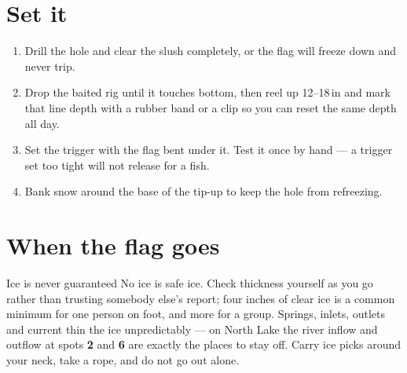\section{Set it}
\begin{enumerate}
\item Drill the hole and clear the slush completely, or the flag will freeze down and never trip.
\item Drop the baited rig until it touches bottom, then reel up 12--18\,in and mark that line depth with a rubber band or a clip so you can reset the same depth all day.
\item Set the trigger with the flag bent under it. Test it once by hand --- a trigger set too tight will not release for a fish.
\item Bank snow around the base of the tip-up to keep the hole from refreezing.
\end{enumerate}

\section{When the flag goes}
\begin{telosfacts}[0.20]
\end{telosfacts}

\begin{teloshazard}{Ice is never guaranteed}
No ice is safe ice. Check thickness yourself as you go rather than trusting somebody else's report; four inches of clear ice is a common minimum for one person on foot, and more for a group. Springs, inlets, outlets and current thin the ice unpredictably --- on North Lake the river inflow and outflow at spots \textbf{2} and \textbf{6} are exactly the places to stay off. Carry ice picks around your neck, take a rope, and do not go out alone.
\end{teloshazard}

